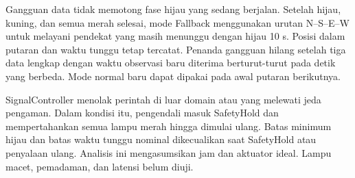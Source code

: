 Gangguan data tidak memotong fase hijau yang sedang berjalan. Setelah hijau, kuning, dan semua merah selesai, mode Fallback menggunakan urutan N--S--E--W untuk melayani pendekat yang masih menunggu dengan hijau 10 s. Posisi dalam putaran dan waktu tunggu tetap tercatat. Penanda gangguan hilang setelah tiga data lengkap dengan waktu observasi baru diterima berturut-turut pada detik yang berbeda. Mode normal baru dapat dipakai pada awal putaran berikutnya.

SignalController menolak perintah di luar domain atau yang melewati jeda pengaman. Dalam kondisi itu, pengendali masuk SafetyHold dan mempertahankan semua lampu merah hingga dimulai ulang. Batas minimum hijau dan batas waktu tunggu nominal dikecualikan saat SafetyHold atau penyalaan ulang. Analisis ini mengasumsikan jam dan aktuator ideal. Lampu macet, pemadaman, dan latensi belum diuji.
